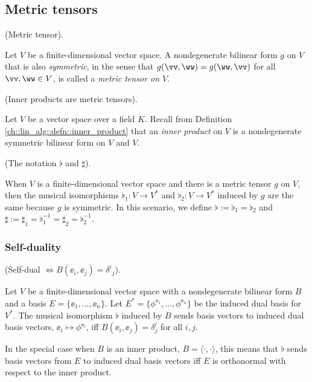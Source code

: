 \newpage

\subsection*{Metric tensors}

\begin{defn}
    (Metric tensor).
    
    Let $V$ be a finite-dimensional vector space. A nondegenerate bilinear form $g$ on $V$ that is also \textit{symmetric}, in the sense that $g(\vv, \ww) = g(\ww, \vv)$ for all $\vv, \ww \in V$, is called a \textit{metric tensor on $V$}.
\end{defn}

\begin{remark}
    (Inner products are metric tensors).
    
    Let $V$ be a vector space over a field $K$. Recall from Definition     \ref{ch::lin_alg::defn::inner_product} that an \textit{inner product} on $V$ is a nondegenerate symmetric bilinear form on $V$ and $V$.
\end{remark}

\begin{defn}
    (The notation $\flat$ and $\sharp$).
    
    When $V$ is a finite-dimensional vector space and there is a metric tensor $g$ on $V$, then the musical isomorphisms ${\flat_1:V \rightarrow V^*}$ and ${\flat_2:V \rightarrow V^*}$ induced by $g$ are the same because $g$ is symmetric. In this scenario, we define $\flat := \flat_1 = \flat_2$ and $\sharp := \sharp_1 = \flat_1^{-1} = \sharp_2 = \flat_2^{-1}$.
\end{defn}

\subsubsection*{Self-duality}

\begin{theorem}
     (Self-dual $\iff B(\ee_i, \ee_j) = \delta^i{}_j$).
     
     Let $V$ be a finite-dimensional vector space with a nondegenerate bilinear form $B$ and a basis $E = \{\ee_1, ..., \ee_n\}$. Let $E^* = \{\phi^{\ee_1}, ..., \phi^{\ee_n}\}$ be the induced dual basis for $V^*$. The musical isomorphism $\flat$ induced by $B$ sends basis vectors to induced dual basis vectors, $\ee_i \mapsto \phi^{\ee_i}$, iff $B(\ee_i, 
     \ee_j) = \delta^i_j$ for all $i, j$. 
     
     In the special case when $B$ is an inner product, $B = \langle \cdot, \cdot \rangle$, this means that $\flat$ sends basis vectors from $E$ to induced dual basis vectors iff $E$ is orthonormal with respect to the inner product.
\end{theorem}

